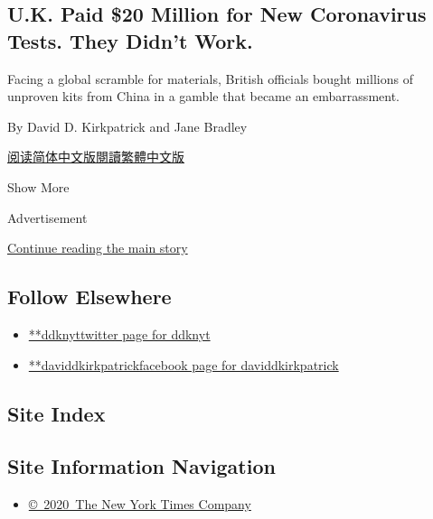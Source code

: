 \begin{enumerate}
  \hypertarget{uk-paid-20-million-for-new-coronavirus-tests-they-didnt-work}{%
  \subsection{U.K. Paid \$20 Million for New Coronavirus Tests. They
  Didn't
  Work.}\label{uk-paid-20-million-for-new-coronavirus-tests-they-didnt-work}}

  Facing a global scramble for materials, British officials bought
  millions of unproven kits from China in a gamble that became an
  embarrassment.

  By David D. Kirkpatrick and Jane Bradley

  \href{https://cn.nytimes3xbfgragh.onion/world/20200417/coronavirus-antibody-test-uk/}{阅读简体中文版}\href{https://cn.nytimes3xbfgragh.onion/world/20200417/coronavirus-antibody-test-uk/zh-hant/}{閱讀繁體中文版}
\end{enumerate}

Show More

Advertisement

\protect\hyperlink{after-mid2}{Continue reading the main story}

\hypertarget{follow-elsewhere}{%
\subsection{Follow Elsewhere}\label{follow-elsewhere}}

\begin{itemize}
\tightlist
\item
  \href{https://twitter.com/ddknyt}{**ddknyttwitter page for ddknyt}
\item
  \href{https://www.facebookcorewwwi.onion/daviddkirkpatrick}{**daviddkirkpatrickfacebook
  page for daviddkirkpatrick}
\end{itemize}

\hypertarget{site-index}{%
\subsection{Site Index}\label{site-index}}

\hypertarget{site-information-navigation}{%
\subsection{Site Information
Navigation}\label{site-information-navigation}}

\begin{itemize}
\tightlist
\item
  \href{https://help.nytimes3xbfgragh.onion/hc/en-us/articles/115014792127-Copyright-notice}{©~2020~The
  New York Times Company}
\end{itemize}

